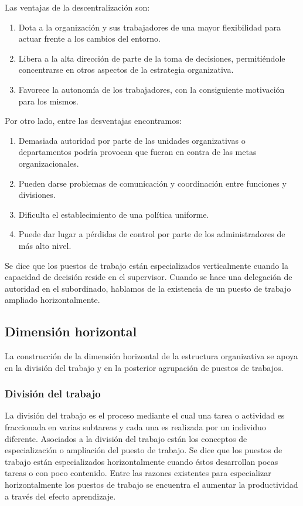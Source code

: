 \documentclass[12pt,a4paper,spanish]{report}
\begin{document}
				Las ventajas de la descentralización son:
				\begin{enumerate}
					\item Dota a la organización y sus trabajadores de una mayor flexibilidad para actuar frente a los cambios del entorno.
					\item Libera a la alta dirección de parte de la toma de decisiones, permitiéndole concentrarse en otros aspectos de la estrategia organizativa.
					\item Favorece la autonomía de los trabajadores, con la consiguiente motivación para los mismos.
				\end{enumerate}
				Por otro lado, entre las desventajas encontramos:
				\begin{enumerate}
					\item Demasiada autoridad por parte de las unidades organizativas o departamentos podría provocan que fueran en contra de las metas organizacionales.
					\item Pueden darse problemas de comunicación y coordinación entre funciones y divisiones.
					\item Dificulta el establecimiento de una política uniforme.
					\item Puede dar lugar a pérdidas de control por parte de los administradores de más alto nivel.
				\end{enumerate}

				Se dice que los puestos de trabajo están especializados verticalmente cuando la capacidad de decisión reside en el supervisor. Cuando se hace una delegación de autoridad en el subordinado, hablamos de la existencia de un puesto de trabajo ampliado horizontalmente.

		\subsection{\textcolor[rgb]{0.5,0.1,0.4}Dimensión horizontal}
			La construcción de la dimensión horizontal de la estructura organizativa se apoya en la división del trabajo y en la posterior agrupación de puestos de trabajos.

			\subsubsection{\textcolor[rgb]{0.5,0.1,0.4}División del trabajo}
				La división del trabajo es el proceso mediante el cual una tarea o actividad es fraccionada en varias subtareas y cada una es realizada por un individuo diferente. Asociados a la división del trabajo están los conceptos de especialización o ampliación del puesto de trabajo. Se dice que los puestos de trabajo están especializados horizontalmente cuando éstos desarrollan pocas tareas o con poco contenido. Entre las razones existentes para especializar horizontalmente los puestos de trabajo se encuentra el aumentar la productividad a través del efecto aprendizaje.
\end{document}
